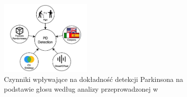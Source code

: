 \begin{figure}[htbp]
	\centering
	\includegraphics[width=0.4\textwidth]{./img/influence_of_factors_on_PD_detection}
	\caption{Czynniki wpływające na dokładność detekcji Parkinsona na podstawie głosu według analizy przeprowadzonej w \cite{SustainedVowelsProblems}}
    \label{fig:factors_PD_detection}
\end{figure}


